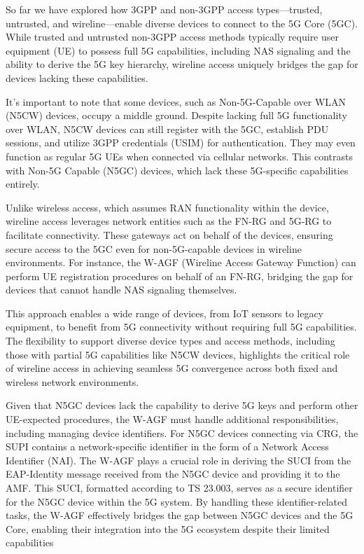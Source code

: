 So far we have explored how 3GPP and non-3GPP access types—trusted, untrusted, and wireline—enable diverse devices to connect to the 5G Core (5GC). While trusted and untrusted non-3GPP access methods typically require user equipment (UE) to possess full 5G capabilities, including NAS signaling and the ability to derive the 5G key hierarchy, wireline access uniquely bridges the gap for devices lacking these capabilities.

It's important to note that some devices, such as Non-5G-Capable over WLAN (N5CW) devices, occupy a middle ground. Despite lacking full 5G functionality over WLAN, N5CW devices can still register with the 5GC, establish PDU sessions, and utilize 3GPP credentials (USIM) for authentication. They may even function as regular 5G UEs when connected via cellular networks. This contrasts with Non-5G Capable (N5GC) devices, which lack these 5G-specific capabilities entirely.

Unlike wireless access, which assumes RAN functionality within the device, wireline access leverages network entities such as the FN-RG and 5G-RG to facilitate connectivity. These gateways act on behalf of the devices, ensuring secure access to the 5GC even for non-5G-capable devices in wireline environments. For instance, the W-AGF (Wireline Access Gateway Function) can perform UE registration procedures on behalf of an FN-RG, bridging the gap for devices that cannot handle NAS signaling themselves.

This approach enables a wide range of devices, from IoT sensors to legacy equipment, to benefit from 5G connectivity without requiring full 5G capabilities. The flexibility to support diverse device types and access methods, including those with partial 5G capabilities like N5CW devices, highlights the critical role of wireline access in achieving seamless 5G convergence across both fixed and wireless network environments.

Given that N5GC devices lack the capability to derive 5G keys and perform other UE-expected procedures, the W-AGF must handle additional responsibilities, including managing device identifiers. For N5GC devices connecting via CRG, the SUPI contains a network-specific identifier in the form of a Network Access Identifier (NAI). The W-AGF plays a crucial role in deriving the SUCI from the EAP-Identity message received from the N5GC device and providing it to the AMF. This SUCI, formatted according to TS 23.003, serves as a secure identifier for the N5GC device within the 5G system. By handling these identifier-related tasks, the W-AGF effectively bridges the gap between N5GC devices and the 5G Core, enabling their integration into the 5G ecosystem despite their limited capabilities

